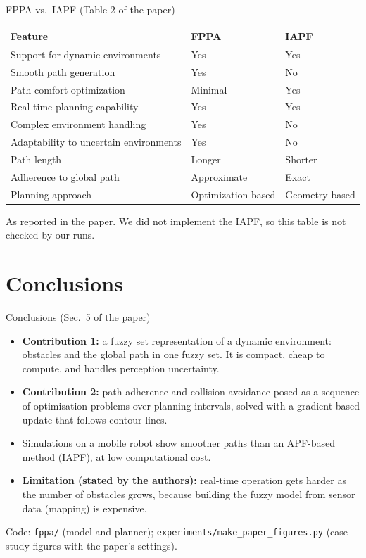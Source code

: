 \documentclass[9pt,aspectratio=169]{beamer}
\begin{document}
\begin{frame}{FPPA vs.\ IAPF (Table 2 of the paper)}
\centering\small
\begin{tabular}{@{}lll@{}}
\toprule
Feature & FPPA & IAPF\\
\midrule
Support for dynamic environments & Yes & Yes\\
Smooth path generation & Yes & No\\
Path comfort optimization & Minimal & Yes\\
Real-time planning capability & Yes & Yes\\
Complex environment handling & Yes & No\\
Adaptability to uncertain environments & Yes & No\\
Path length & Longer & Shorter\\
Adherence to global path & Approximate & Exact\\
Planning approach & Optimization-based & Geometry-based\\
\bottomrule
\end{tabular}

\medskip
\small As reported in the paper. We did not implement the IAPF, so this table is not checked by our runs.
\end{frame}

\section{Conclusions}
\begin{frame}{Conclusions (Sec.~5 of the paper)}
\begin{itemize}
  \item \textbf{Contribution 1:} a fuzzy set representation of a dynamic environment: obstacles and the global path in one fuzzy set. It is compact, cheap to compute, and handles perception uncertainty.
  \item \textbf{Contribution 2:} path adherence and collision avoidance posed as a sequence of optimisation problems over planning intervals, solved with a gradient-based update that follows contour lines.
  \item Simulations on a mobile robot show smoother paths than an APF-based method (IAPF), at low computational cost.
  \item \textbf{Limitation (stated by the authors):} real-time operation gets harder as the number of obstacles grows, because building the fuzzy model from sensor data (mapping) is expensive.
\end{itemize}
\vfill
\small Code: \texttt{fppa/} (model and planner); \texttt{experiments/make\_paper\_figures.py} (case-study figures with the paper's settings).
\end{frame}
\end{document}
